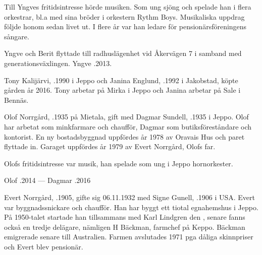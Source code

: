 Till Yngves fritidsintresse hörde musiken. Som ung sjöng och spelade han i flera orkestrar, bl.a med sina bröder i orkestern Rythm Boys. Musikaliska uppdrag följde honom sedan livet ut. I flere år var han ledare för pensionärsföreningens sångare.

Yngve och Berit flyttade till radhuslägenhet vid Åkervägen 7 i samband med generationsväxlingen. Yngve .2013.



%



%
Tony Kalijärvi, .1990 i Jeppo och Janina Englund, .1992 i Jakobstad, köpte gården år 2016. Tony arbetar på Mirka i Jeppo och Janina arbetar på Sale i Bennäs.


%
Olof Norrgård, .1935 på Mietala, gift med Dagmar Sundell, .1935  i Jeppo. Olof har arbetat som minkfarmare och chaufför, Dagmar som butiksföreståndare och kontorist. En ny bostadsbyggnad uppfördes år 1978 av Oravais Hus och paret flyttade in. Garaget uppfördes år 1979 av Evert Norrgård, Olofs far.

Olofs fritidsintresse var musik, han spelade som ung i Jeppo hornorkester.

Olof .2014  ---  Dagmar .2016



%



%
Evert Norrgård, .1905, gifte sig 06.11.1932 med Signe Gunell, .1906 i USA. Evert var byggnadssnickare och chaufför. Han har byggt ett tiotal egnahemshus i Jeppo. På 1950-talet startade han tillsammans med Karl Lindgren den , senare fanns också en tredje delägare, nämligen H Bäckman, farmchef på Keppo. Bäckman emigrerade senare till Australien. Farmen avslutades 1971 pga dåliga skinnpriser och Evert blev pensionär.

